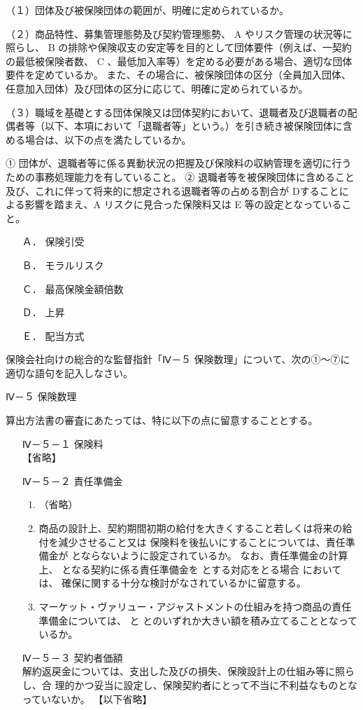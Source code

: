 \documentclass[report,gutter=10mm,fore-edge=10mm,uplatex,dvipdfmx]{jlreq}
\begin{document}
（１）団体及び被保険団体の範囲が、明確に定められているか。

（２）商品特性、募集管理態勢及び契約管理態勢、 A やリスク管理の状況等に照らし、 B
の排除や保険収支の安定等を目的として団体要件（例えば、一契約の最低被保険者数、 C
、最低加入率等）を定める必要がある場合、適切な団体要件を定めているか。
また、その場合に、被保険団体の区分（全員加入団体、任意加入団体）及び団体の区分に応じて、明確に定められているか。

（３）職域を基礎とする団体保険又は団体契約において、退職者及び退職者の配偶者等（以下、本項において「退職者等」という。）を引き続き被保険団体に含める場合は、以下の点を満たしているか。

① 団体が、退職者等に係る異動状況の把握及び保険料の収納管理を適切に行うための事務処理能力を有していること。
② 退職者等を被保険団体に含めること及び、これに伴って将来的に想定される退職者等の占める割合が
Dすることによる影響を踏まえ、A リスクに見合った保険料又は E 等の設定となっていること。

\answer{}
\begin{itemize}
\item[ Ａ．] 保険引受 
\item[ Ｂ．] モラルリスク 
\item[ Ｃ．] 最高保険金額倍数 
\item[ Ｄ．] 上昇
\item[ Ｅ．] 配当方式
\end{itemize}

保険会社向けの総合的な監督指針「Ⅳ－５ 保険数理」について、次の①～⑦に適切な語句を記入しなさい。

\noindent{} Ⅳ－５ 保険数理

算出方法書の審査にあたっては、特に以下の点に留意することとする。
\begin{itemize}
 \item [] Ⅳ－５－１ 保険料\\
【省略】
 \item [] Ⅳ－５－２ 責任準備金
\begin{enumerate}[(1)]
\item  （省略）
\item 商品の設計上、契約期間初期の給付を大きくすること若しくは将来の給付を減少させること又は
 保険料を後払いにすることについては、責任準備金が  とならないように設定されているか。
 なお、責任準備金の計算上、  となる契約に係る責任準備金を  とする対応をとる場合
 においては、  確保に関する十分な検討がなされているかに留意する。
\item マーケット・ヴァリュー・アジャストメントの仕組みを持つ商品の責任準備金については、
 と  とのいずれか大きい額を積み立てることとなっているか。
\end{enumerate} 
\item [] Ⅳ－５－３ 契約者価額\\
解約返戻金については、支出した及びの損失、保険設計上の仕組み等に照らし、合
理的かつ妥当に設定し、保険契約者にとって不当に不利益なものとなっていないか。
【以下省略】
\end{itemize}
\end{document}
